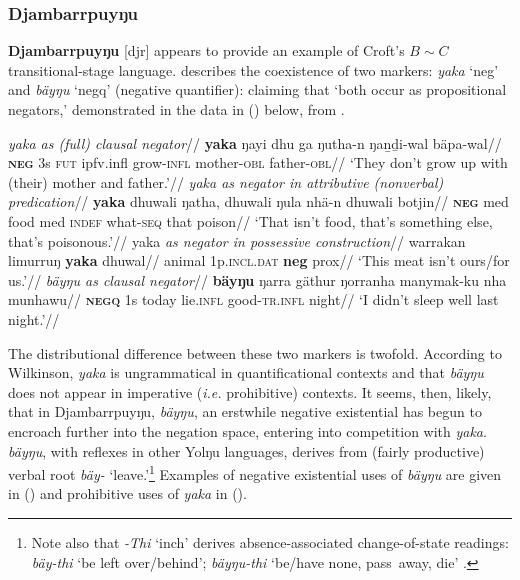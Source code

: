 {\subsubsection{Djambarrpuyŋu} \textbf{Djambarrpuyŋu} [\gls{djr}] appears to provide an example of Croft's $B\sim C$ transitional-stage language. \citet[356]{Wilkinson1991} describes the coexistence of two markers: \textit{yaka} `\gls{neg}' and \textit{bäyŋu} `\gls{negq}' (negative quantifier): claiming that `both occur as propositional negators,' demonstrated in the data in (\nextx) below, from \citet{Wilkinson1991}.

\pex
\a\begingl\glpreamble \textit{{\em yaka} as (full) clausal negator}//
\gla \textbf{yaka} ŋayi dhu ga ŋutha-n ŋaṉḏi-wal bäpa-wal//
\glb \textsc{\textbf{neg}} 3\gls{s} \textsc{fut} \gls{ipfv}.\gls{infl} grow-\textsc{infl} mother\textsc{-obl} father\textsc{-obl}//
\glft `They don't grow up with (their) mother and father.'//
\endgl
\a\begingl\glpreamble \textit{{\em yaka} as negator in attributive (nonverbal) predication}//
\gla \textbf{yaka} dhuwali ŋatha, dhuwali ŋula nhä-n dhuwali botjin//
\glb \textsc{\textbf{neg}} \gls{med} food \gls{med} \textsc{indef} what-\textsc{seq} that poison//
\glft`That isn't food, that's something else, that's poisonous.'//\endgl
\a\begingl\glpreamble yaka \textit{as negator in possessive construction}//
\gla warrakan limurruŋ \textbf{yaka} dhuwal//
\glb animal 1\gls{p}.\textsc{incl.dat} \textbf{\gls{neg}} \gls{prox}//
\glft`This meat isn't ours/for us.'\trailingcitation{[AW~20190505]}//
\endgl
\a\begingl
\glpreamble\textit{ {\em bäyŋu} as clausal negator}//
\gla \textbf{bäyŋu} ŋarra gäthur ŋorranha manymak-ku	nha munhawu//
\glb \textsc{\textbf{negq}} 1\gls{s} today lie\textsc{.infl} good-\textsc{tr.infl} night//
\glft `I didn't sleep well last night.'\hfill\citep[357]{Wilkinson1991}//
\endgl{}\xe

The distributional difference between these two markers is twofold. According to Wilkinson, \textit{yaka} is ungrammatical in quantificational contexts and that \textit{bäyŋu} does not appear in imperative (\textit{i.e.} prohibitive) contexts. It seems, then, likely, that in Djambarrpuyŋu, \textit{bäyŋu}, an erstwhile negative existential has begun to encroach further into the negation space, entering into competition with \textit{yaka}. \textit{bäyŋu}, with reflexes in other Yolŋu languages, derives from (fairly productive) verbal root \textit{bäy-} `leave.'\footnote{Note also that \textit{-Thi} `\gls{inch}' derives absence-associated change-of-state readings: \textit{bäy-thi} `be left over/behind'; \textit{bäyŋu-thi} `be/have none, pass~away, die' \citep[378]{Wilkinson1991}.} Examples of negative existential uses of \textit{bäyŋu} are given in (\nextx) and prohibitive uses of \textit{yaka} in (\anextx).


}
